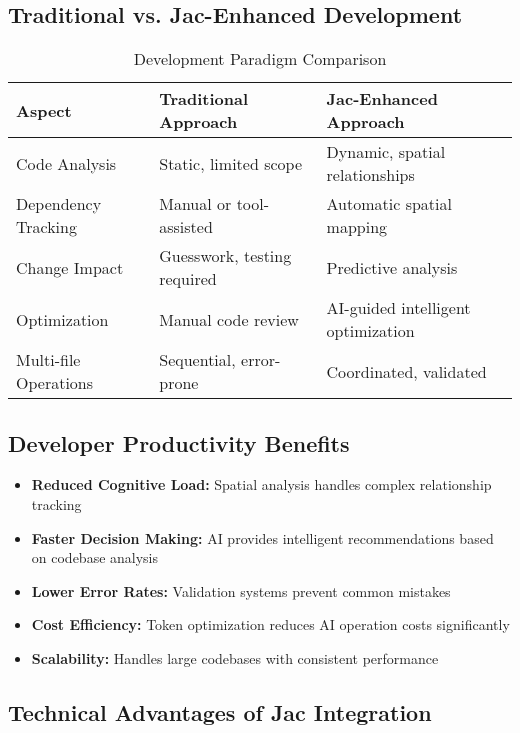 \documentclass[12pt,a4paper]{article}
\begin{document}
\subsection{Traditional vs. Jac-Enhanced Development}

\begin{table}[H]
\centering
\caption{Development Paradigm Comparison}
\begin{tabularx}{\textwidth}{|l|X|X|}
\hline
\textbf{Aspect} & \textbf{Traditional Approach} & \textbf{Jac-Enhanced Approach} \\
\hline
Code Analysis & Static, limited scope & Dynamic, spatial relationships \\
\hline
Dependency Tracking & Manual or tool-assisted & Automatic spatial mapping \\
\hline
Change Impact & Guesswork, testing required & Predictive analysis \\
\hline
Optimization & Manual code review & AI-guided intelligent optimization \\
\hline
Multi-file Operations & Sequential, error-prone & Coordinated, validated \\
\hline
\end{tabularx}
\end{table}

\subsection{Developer Productivity Benefits}

\begin{itemize}
    \item \textbf{Reduced Cognitive Load:} Spatial analysis handles complex relationship tracking
    \item \textbf{Faster Decision Making:} AI provides intelligent recommendations based on codebase analysis
    \item \textbf{Lower Error Rates:} Validation systems prevent common mistakes
    \item \textbf{Cost Efficiency:} Token optimization reduces AI operation costs significantly
    \item \textbf{Scalability:} Handles large codebases with consistent performance
\end{itemize}

\subsection{Technical Advantages of Jac Integration}
\end{document}
